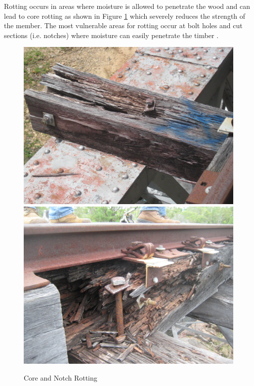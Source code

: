 \documentclass[11pt,a4paper]{article}
\numberwithin{equation}{subsection}
\begin{document}
	 \noindent
	 Rotting occurs in areas where moisture is allowed to penetrate the wood and can lead to core rotting as shown in Figure \ref{fig:Rot} which severely reduces the strength of the member. The most vulnerable areas for rotting occur at bolt holes and cut sections (i.e. notches) where moisture can easily penetrate the timber \cite{_timber_2005,white_bridge_1992}. 
	 \vspace*{\baselineskip}
	 	\begin{figure}[h]
	 		\includegraphics[scale=0.07]{Core_Rotting}
	 		\includegraphics[scale=0.07]{Notch_Rotting}
	 		\caption{Core and Notch Rotting}
	 	    \label{fig:Rot}
	 	\end{figure} 
	
\end{document}
